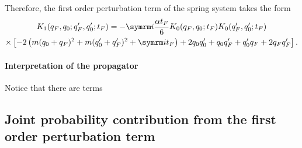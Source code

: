 Therefore, the first order perturbation term of the spring system takes the form
\begin{multline}
    K_1(q_F, q_0; q_F', q_0'; t_F) = -\im\frac{\alpha t_F}{6}K_0(q_F, q_0; t_F)K_0(q_F', q_0'; t_F) \\
    \times\left[-2\left(m(q_0 + q_F)^2 + m(q_0' + q_F')^2 + \im t_F\right) + 2q_0q_0' + q_0q_F' + q_0'q_F + 2q_Fq_F'\right]. \label{eq:spring_first_order_perturbation}
\end{multline}

\paragraph{Interpretation of the propagator} Notice that there are terms

\subsection{Joint probability contribution from the first order perturbation term}


